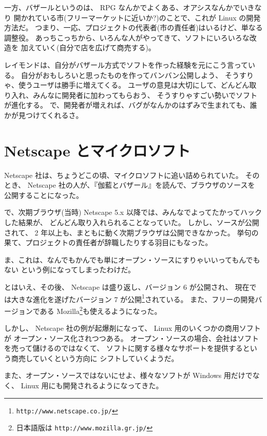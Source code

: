 \documentclass[11pt]{jarticle}
\begin{document}
一方、バザールというのは、 RPG なんかでよくある、オアシスなんかでいきなり
開かれている市(フリーマーケットに近いか?)のことで、これが Linux の開発方法だ。
つまり、一応、プロジェクトの代表者(市の責任者)はいるけど、単なる調整役。
あっちこっちから、いろんな人がやってきて、ソフトにいろいろな改造を
加えていく(自分で店を広げて商売する)。

レイモンドは、自分がバザール方式でソフトを作った経験を元にこう言っている。
自分がおもしろいと思ったものを作ってバンバン公開しよう、
そうすりゃ、使うユーザは勝手に増えてくる。
ユーザの意見は大切にして、どんどん取り入れ、みんなに開発者に加わってもらおう、
そうすりゃすごい勢いでソフトが進化する。
で、開発者が増えれば、バグがなんかのはずみで生まれても、誰かが見つけてくれるさ。

\section{Netscape とマイクロソフト}

 Netscape 社は、ちょうどこの頃、マイクロソフトに追い詰められていた。
そのとき、 Netscape 社の人が、『伽藍とバザール』を読んで、ブラウザのソースを
公開することになった。

で、次期ブラウザ(当時) Netscape 5.x 以降では、みんなでよってたかってハックした結果が、
どんどん取り入れられることなっていた。
しかし、ソースが公開されて、 2 年以上も、まともに動く次期ブラウザは公開できなかった。
挙句の果て、プロジェクトの責任者が辞職したりする羽目にもなった。

ま、これは、なんでもかんでも単にオープン・ソースにすりゃいいってもんでもない
という例になってしまったわけだ。

とはいえ、その後、 Netscape は盛り返し、バージョン 6 が公開され、
現在では大きな進化を遂げたバージョン 7 が公開\footnote{\texttt{http://www.netscape.co.jp/}}されている。
また、フリーの開発バージョンである Mozilla\footnote{日本語版は \texttt{http://www.mozilla.gr.jp/}}も使えるようになった。

\bigskip

しかし、 Netscape 社の例が起爆剤になって、 Linux 用のいくつかの商用ソフトが
オープン・ソース化されつつある。
オープン・ソースの場合、会社はソフトを売って儲けるのではなくて、
ソフトに関する様々なサポートを提供するという商売していくという方向に
シフトしていくようだ。

また、オープン・ソースではないにせよ、様々なソフトが Windows 用だけでなく、
 Linux 用にも開発されるようになってきた。

\bigskip
\end{document}
